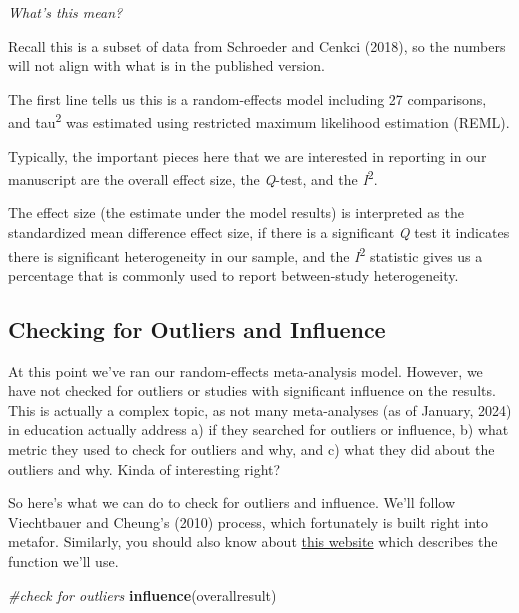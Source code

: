 \documentclass[
]{book}
\newenvironment{Shaded}{\begin{snugshade}}{\end{snugshade}}
\newcommand{\CommentTok}[1]{\textcolor[rgb]{0.56,0.35,0.01}{\textit{#1}}}
\newcommand{\FunctionTok}[1]{\textcolor[rgb]{0.13,0.29,0.53}{\textbf{#1}}}
\newcommand{\NormalTok}[1]{#1}
\begin{document}
\emph{What's this mean?}

Recall this is a subset of data from Schroeder and Cenkci (2018)\citep{schroeder2018}, so the numbers will not align with what is in the published version.

The first line tells us this is a random-effects model including 27 comparisons, and tau\textsuperscript{2} was estimated using restricted maximum likelihood estimation (REML).

Typically, the important pieces here that we are interested in reporting in our manuscript are the overall effect size, the \emph{Q}-test, and the \emph{I}\textsuperscript{2}.

The effect size (the estimate under the model results) is interpreted as the standardized mean difference effect size, if there is a significant \emph{Q} test it indicates there is significant heterogeneity in our sample, and the \emph{I}\textsuperscript{2} statistic gives us a percentage that is commonly used to report between-study heterogeneity.

\hypertarget{checking-for-outliers-and-influence}{%
\subsection{Checking for Outliers and Influence}\label{checking-for-outliers-and-influence}}

At this point we've ran our random-effects meta-analysis model. However, we have not checked for outliers or studies with significant influence on the results. This is actually a complex topic, as not many meta-analyses (as of January, 2024) in education actually address a) if they searched for outliers or influence, b) what metric they used to check for outliers and why, and c) what they did about the outliers and why. Kinda of interesting right?

So here's what we can do to check for outliers and influence. We'll follow Viechtbauer and Cheung's (2010) \citep{viechtbauer2010a} process, which fortunately is built right into metafor. Similarly, you should also know about \href{https://wviechtb.github.io/metafor/reference/influence.rma.uni.html}{this website} which describes the function we'll use.

\begin{Shaded}
\begin{Highlighting}[]
\CommentTok{\#check for outliers}
\FunctionTok{influence}\NormalTok{(overallresult)}
\end{Highlighting}
\end{Shaded}
\end{document}
